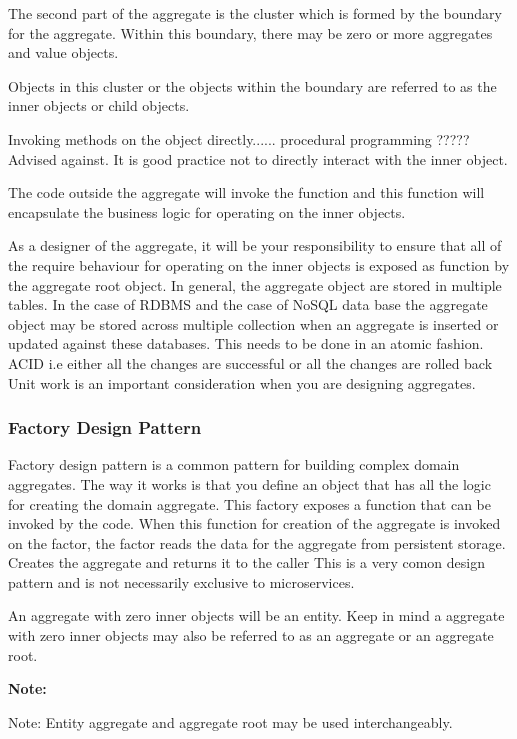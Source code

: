 \documentclass[a4paper, 11pt]{book}
\newenvironment{note}{
    \begin{siderule}
        \textbf{Note: }
        }{
    \end{siderule}
}
\begin{document}
    The second part of the aggregate is the cluster which is formed by the boundary for the aggregate.
    Within this boundary, there may be zero or more aggregates and value objects.

    Objects in this cluster or the objects within the boundary are referred to as the inner objects or child objects.

    Invoking methods on the object directly...... procedural programming ????? Advised against.
    It is good practice not to directly interact with the inner object.

    The code outside the aggregate will invoke the function and this function will encapsulate the business logic for operating on the inner objects.

    As a designer of the aggregate, it will be your responsibility to ensure that all of the require behaviour for operating on the inner objects is exposed as function by the aggregate root object.
    In general, the aggregate object are stored in multiple tables.
    In the case of RDBMS and the case of NoSQL data base the aggregate object may be stored across multiple collection when an aggregate is inserted or updated against these databases.
    This needs to be done in an atomic fashion.
    ACID i.e either all the changes are successful or all the changes are rolled back %
    Unit work is an important consideration when you are designing aggregates.

    \subsubsection{Factory Design Pattern}
    Factory design pattern is a common pattern for building complex domain aggregates.
    The way it works is that you define an object that has all the logic for creating the domain aggregate.
    This factory exposes a function that can be invoked by the code.
    When this function for creation of the aggregate is invoked on the factor, the factor reads the data for the aggregate from persistent storage.
    Creates the aggregate and returns it to the caller
    This is a very comon design pattern and is not necessarily exclusive to microservices.

    An aggregate with zero inner objects will be an entity.
    Keep in mind a aggregate with zero inner objects may also be referred to as an aggregate or an aggregate root.

    \begin{note}
    Note: Entity aggregate and aggregate root may be used interchangeably.
    \end{note}
\end{document}
